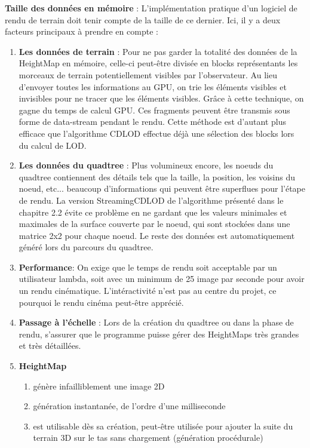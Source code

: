 \documentclass[12pt]{report}
\begin{document}
\textbf{Taille des données en mémoire} : L'implémentation pratique d'un logiciel de rendu de terrain doit tenir compte de la taille de ce dernier. Ici, il y a deux facteurs principaux à prendre en compte :
\begin{enumerate}
    \item \textbf{Les données de terrain} : Pour ne pas garder la totalité des données de la HeightMap en mémoire, celle-ci peut-être divisée en blocks représentants les morceaux de terrain potentiellement visibles par l'observateur. Au lieu d'envoyer toutes les informations au GPU, on trie les éléments visibles et invisibles pour ne tracer que les éléments visibles. Grâce à cette technique, on gagne du temps de calcul GPU. Ces fragments peuvent être transmis sous forme de data-stream pendant le rendu. Cette méthode est d'autant plus efficace que l'algorithme CDLOD effectue déjà une sélection des blocks lors du calcul de LOD. 
    \item \textbf{Les données du quadtree} : Plus volumineux encore, les noeuds du quadtree contiennent des détails tels que la taille, la position, les voisins du noeud, etc... beaucoup d'informations qui peuvent être superflues pour l'étape de rendu. La version StreamingCDLOD de l'algorithme présenté dans le chapitre 2.2 évite ce problème en ne gardant que les valeurs minimales et maximales de la surface couverte par le noeud, qui sont stockées dans une matrice 2x2 pour chaque noeud. Le reste des données est automatiquement généré lors du parcours du quadtree.
    \item \textbf{Performance}: On exige que le temps de rendu soit acceptable par un utilisateur lambda, soit avec un minimum de 25 image par seconde pour avoir un rendu cinématique. L'intéractivité  n'est pas au centre du projet, ce pourquoi le rendu cinéma peut-être apprécié.
    \item \textbf{Passage à l'échelle} : Lors de la création du quadtree ou dans la phase de rendu, s'assurer que le programme puisse gérer des HeightMaps très grandes et très détaillées.
    \item \textbf{HeightMap}
    \begin{enumerate}
        \item génère infailliblement une image 2D
        \item génération instantanée, de l'ordre d'une milliseconde
        \item est utilisable dès sa création, peut-être utilisée pour ajouter la suite du terrain 3D sur le tas sans chargement (génération procédurale)

\end{enumerate}
\end{enumerate}
\end{document}
